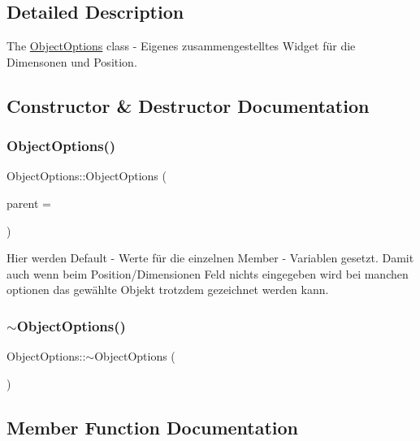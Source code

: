 \subsection{Detailed Description}
The \hyperlink{class_object_options}{Object\+Options} class -\/ Eigenes zusammengestelltes Widget für die Dimensonen und Position. 

\subsection{Constructor \& Destructor Documentation}
\mbox{\label{class_object_options_aec863b929bf4ccba84210b58ab23e530}} 
\subsubsection{\texorpdfstring{Object\+Options()}{ObjectOptions()}}
{\footnotesize\ttfamily Object\+Options\+::\+Object\+Options (\begin{DoxyParamCaption}\item[{Q\+Widget $\ast$}]{parent = {} }\end{DoxyParamCaption})\hspace{0.3cm}{\ttfamily [explicit]}}

Hier werden Default -\/ Werte für die einzelnen Member -\/ Variablen gesetzt. Damit auch wenn beim Position/\+Dimensionen Feld nichts eingegeben wird bei manchen optionen das gewählte Objekt trotzdem gezeichnet werden kann.\mbox{\label{class_object_options_a93a5c0da34ad8420c19b65d76296f9c0}} 
\subsubsection{\texorpdfstring{$\sim$\+Object\+Options()}{~ObjectOptions()}}
{\footnotesize\ttfamily Object\+Options\+::$\sim$\+Object\+Options (\begin{DoxyParamCaption}{ }\end{DoxyParamCaption})}



\subsection{Member Function Documentation}
\mbox{\label{class_object_options_af520e91fb7c4980c04e21f1a306264b1}} 
